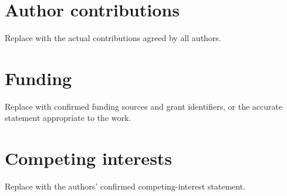\documentclass[11pt]{article}
\begin{document}
\section*{Author contributions}
Replace with the actual contributions agreed by all authors.

\section*{Funding}
Replace with confirmed funding sources and grant identifiers, or the accurate
statement appropriate to the work.

\section*{Competing interests}
Replace with the authors' confirmed competing-interest statement.



\end{document}
